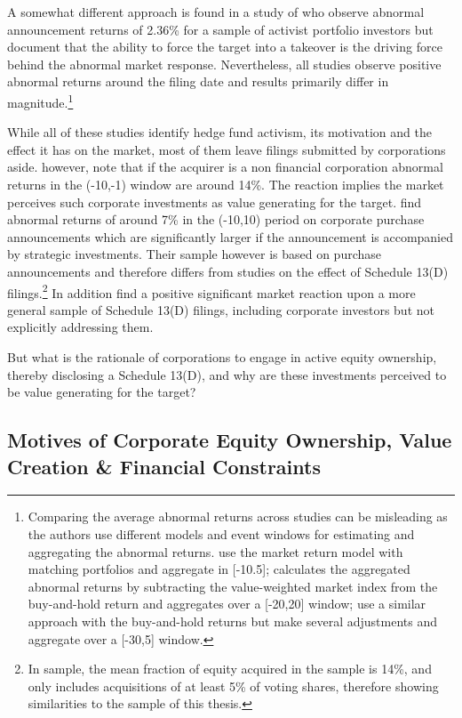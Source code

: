 \documentclass[12pt]{article}
\begin{document}
A somewhat different approach is found in a study of \citet[p.363]{Greenwood2009} who observe abnormal announcement returns of 2.36\% for a sample of activist portfolio investors but document that the ability to force the target into a takeover is the driving force behind the abnormal market response. Nevertheless, all studies observe positive abnormal returns around the filing date and results primarily differ in magnitude.\footnote{Comparing the average abnormal returns across studies can be misleading as the authors use different models and event windows for estimating and aggregating the abnormal returns. \citet{Greenwood2009} use the market return model with matching portfolios and aggregate in [-10.5]; \citet{Brav2008} calculates the aggregated abnormal returns by subtracting the value-weighted market index from the buy-and-hold return and aggregates over a [-20,20] window; \citet{Klein2009} use a similar approach with the buy-and-hold returns but make several adjustments and aggregate over a [-30,5] window.}\par
While all of these studies identify hedge fund activism, its motivation and the effect it has on the market, most of them leave filings submitted by corporations aside. \citet[p.29]{Brigida2012} however, note that if the acquirer is a non financial corporation abnormal returns in the (-10,-1) window are around 14\%. The reaction implies the market perceives such corporate investments as value generating for the target. \citet[p.2803]{Allen2000} find abnormal returns of around 7\% in the (-10,10) period on corporate purchase announcements which are significantly larger if the announcement is accompanied by strategic investments. Their sample however is based on purchase announcements and therefore differs from studies on the effect of Schedule 13(D) filings.\footnote{In \citet[p.2801]{Allen2000} sample, the mean fraction of equity acquired in the sample is 14\%, and  only includes acquisitions of at least 5\% of voting shares, therefore showing similarities to the sample of this thesis.} In addition \citet{Collin-Dufresne2015} find a positive significant market reaction upon a more general sample of Schedule 13(D) filings, including corporate investors but not explicitly addressing them.\par
But what is the rationale of corporations to engage in active equity ownership, thereby disclosing a Schedule 13(D), and why are these investments perceived to be value generating for the target?

\subsection{Motives of Corporate Equity Ownership, Value Creation \& Financial Constraints}
\end{document}
